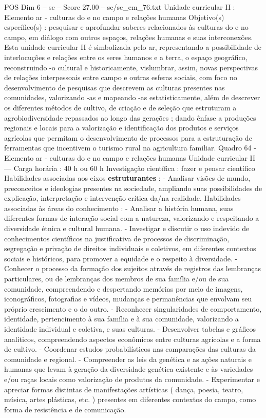 \begin{textsample}{POS Dim 6 – sc – Score 27.00 – sc/sc\_em\_76.txt}
Unidade curricular II : Elemento ar - culturas do e no campo e relações humanas Objetivo(s) específico(s) : pesquisar e aprofundar saberes relacionados às culturas do e no campo, em diálogo com outros espaços, relações humanas e suas interconexões.
Esta unidade curricular II é simbolizada pelo ar, representando a possibilidade de interlocuções e relações entre os seres humanos e a terra, o espaço geográfico, reconstruindo -o cultural e historicamente, vislumbrar, assim, novas perspectivas de relações interpessoais entre campo e outras esferas sociais, com foco no desenvolvimento de pesquisas que descrevem as culturas presentes nas comunidades, valorizando -as e mapeando -as estatisticamente, além de descrever os diferentes métodos de cultivo, de criação e de seleção que estruturam a agrobiodiversidade repassados ao longo das gerações ; dando ênfase a produções regionais e locais para a valorização e identificação dos produtos e serviços agrícolas que permitam o desenvolvimento de processos para a estruturação de ferramentas que incentivem o turismo rural na agricultura familiar.
Quadro 64 - Elemento ar - culturas do e no campo e relações humanas Unidade curricular II — Carga horária : 40 h ou 60 h Investigação científica : fazer e pensar científico Habilidades associadas aos eixos \textbf{estruturantes} : - Analisar visões de mundo, preconceitos e ideologias presentes na sociedade, ampliando suas possibilidades de explicação, interpretação e intervenção crítica da/na realidade.
Habilidades associadas às áreas do conhecimento : - Analisar a história humana, suas diferentes formas de interação social com a natureza, valorizando e respeitando a diversidade étnica e cultural humana. - Investigar e discutir o uso indevido de conhecimentos científicos na justificativa de processos de discriminação, segregação e privação de direitos individuais e coletivos, em diferentes contextos sociais e históricos, para promover a equidade e o respeito à diversidade. - Conhecer o processo da formação dos sujeitos através de registros das lembranças particulares, ou de lembranças dos membros de sua família e/ou de sua comunidade, compreendendo e despertando memórias por meio de imagens, iconográficos, fotografias e vídeos, mudanças e permanências que envolvam seu próprio crescimento e o do outro. - Reconhecer singularidades de comportamento, identidade, pertencimento à sua família e à sua comunidade, valorizando a identidade individual e coletiva, e suas culturas. - Desenvolver tabelas e gráficos analíticos, compreendendo aspectos econômicos entre culturas agrícolas e a forma de cultivo. - Coordenar estudos probabilísticos nas comparações das culturas da comunidade e regional. - Compreender as leis da genética e as ações naturais e humanas que levam à geração da diversidade genética existente e às variedades e/ou raças locais como valorização de produtos da comunidade. - Experimentar e apreciar formas distintas de manifestações artísticas ( dança, poesia, teatro, música, artes plásticas, etc. ) presentes em diferentes contextos do campo, como forma de resistência e de comunicação.

\end{textsample}
